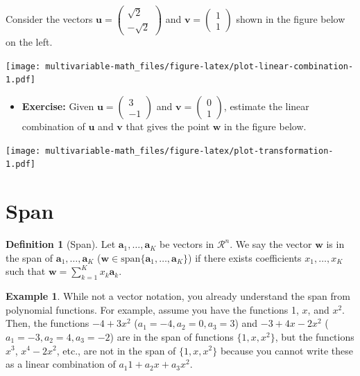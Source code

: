 \documentclass[
]{book}
\providecommand{\tightlist}{%
  \setlength{\itemsep}{0pt}\setlength{\parskip}{0pt}}
\theoremstyle{definition}
\newtheorem{definition}{Definition}[chapter]
\theoremstyle{definition}
\newtheorem{example}{Example}[chapter]
\theoremstyle{definition}
\theoremstyle{definition}
\theoremstyle{remark}
\begin{document}
Consider the vectors \(\mathbf{u} = \begin{pmatrix} \sqrt{2} \\ - \sqrt{2} \end{pmatrix}\) and \(\mathbf{v} = \begin{pmatrix} 1 \\ 1 \end{pmatrix}\) shown in the figure below on the left.

\texttt{[image: multivariable-math\_files/figure-latex/plot-linear-combination-1.pdf]}

\begin{itemize}
\tightlist
\item
  \textbf{Exercise:} Given \(\mathbf{u} = \begin{pmatrix} 3 \\ -1 \end{pmatrix}\) and \(\mathbf{v} = \begin{pmatrix} 0 \\ 1 \end{pmatrix}\), estimate the linear combination of \(\mathbf{u}\) and \(\mathbf{v}\) that gives the point \(\mathbf{w}\) in the figure below.
\end{itemize}

\texttt{[image: multivariable-math\_files/figure-latex/plot-transformation-1.pdf]}

\hypertarget{span}{%
\section{Span}\label{span}}

\begin{definition}[Span]
\protect\hypertarget{def:span}{}\label{def:span}Let \(\mathbf{a}_1, \ldots, \mathbf{a}_K\) be vectors in \(\mathcal{R}^n\). We say the vector \(\mathbf{w}\) is in the span of \(\mathbf{a}_1, \ldots, \mathbf{a}_K\) (\(\mathbf{w} \in \mbox{span}\{ \mathbf{a}_1, \ldots, \mathbf{a}_K \}\)) if there exists coefficients \(x_1, \ldots, x_K\) such that \(\mathbf{w} = \sum_{k=1}^K x_k \mathbf{a}_k\).
\end{definition}

\begin{example}
While not a vector notation, you already understand the span from polynomial functions. For example, assume you have the functions 1, \(x\), and \(x^2\). Then, the functions \(-4 + 3x^2\) (\(a_1 = -4, a_2 = 0, a_3 = 3\)) and \(-3 + 4x - 2x^2\) (\(a_1 = -3, a_2 = 4, a_3 = -2\)) are in the span of functions \(\{1, x, x^2\}\), but the functions \(x^3\), \(x^4 - 2x^2\), etc., are not in the span of \(\{1, x, x^2\}\) because you cannot write these as a linear combination of \(a_1 1 + a_2 x + a_3 x^2\).
\end{example}
\end{document}
